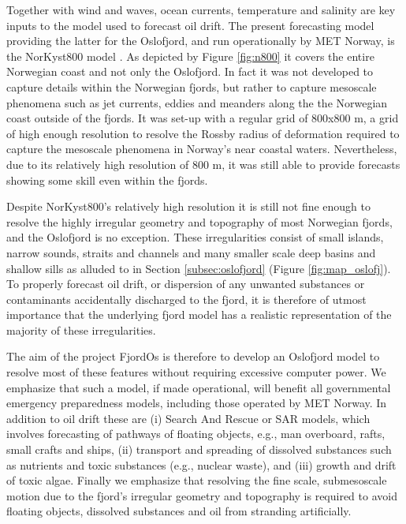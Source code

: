 Together with wind and waves, ocean currents, temperature and salinity are key inputs to the model used to forecast oil drift. The present forecasting model providing the latter for the Oslofjord, and run operationally by MET Norway, is the NorKyst800 model \citep{albre:etal:2011}. As depicted by Figure \ref{fig:n800} it covers the entire Norwegian coast and not only the Oslofjord. In fact it was not developed to capture details within the Norwegian fjords, but rather to capture mesoscale phenomena such as jet currents, eddies and meanders along the the Norwegian coast outside of the fjords. It was set-up with a regular grid of 800x800 m, a grid of high  enough resolution to resolve the Rossby radius of deformation required to capture the mesoscale phenomena in Norway's near coastal waters. Nevertheless, due to its relatively high resolution of 800 m, it was still able to provide forecasts showing some skill even within the fjords.


Despite NorKyst800's relatively high resolution it is still not fine enough to resolve the highly irregular geometry and topography of most Norwegian fjords, and the Oslofjord is no exception. These irregularities consist of small islands, narrow sounds, straits and channels and many smaller scale deep basins and shallow sills as alluded to in Section \ref{subsec:oslofjord} (Figure \ref{fig:map_oslofj}). To properly forecast oil drift, or dispersion of any unwanted substances or contaminants accidentally discharged to the fjord, it is therefore of utmost importance that the underlying fjord model has a realistic representation of the majority of these irregularities. 

The aim of the project FjordOs is therefore to develop an Oslofjord model to resolve most of these features without requiring excessive computer power. We emphasize that such a model, if made operational, will benefit all governmental emergency preparedness models, including those operated by MET Norway. In addition to oil drift these are (i) Search And Rescue or SAR models, which involves forecasting of pathways of floating objects, e.g., man overboard, rafts, small crafts and ships, (ii) transport and spreading of dissolved substances such as nutrients and toxic substances (e.g., nuclear waste), and (iii) growth and drift of toxic algae. Finally we emphasize that resolving the fine scale, submesoscale motion due to the fjord's irregular geometry and topography is required to avoid floating objects, dissolved substances and oil from stranding artificially.  

